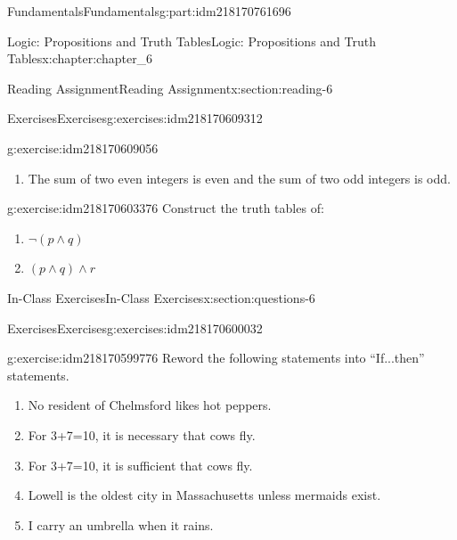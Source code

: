 \documentclass[oneside,10pt,]{book}
\numberwithin{equation}{section}
\begin{document}
\begin{partptx}{Fundamentals}{}{Fundamentals}{}{}{g:part:idm218170761696}
\begin{chapterptx}{Logic: Propositions and Truth Tables}{}{Logic: Propositions and Truth Tables}{}{}{x:chapter:chapter_6}
\begin{sectionptx}{Reading Assignment}{}{Reading Assignment}{}{}{x:section:reading-6}
\begin{exercises-subsection-numberless}{Exercises}{}{Exercises}{}{}{g:exercises:idm218170609312}
\begin{exercisegroup}
\begin{divisionexerciseeg}{1}{}{}{g:exercise:idm218170609056}
\begin{enumerate}[label=(\alph*)]
\item{}The sum of two even integers is even and the sum of two odd integers is odd.%
\end{enumerate}
%
\end{divisionexerciseeg}%
\begin{divisionexerciseeg}{2}{}{}{g:exercise:idm218170603376}%
Construct the truth tables of:%
\begin{multicols}{2}
\begin{enumerate}[label=(\alph*)]
\item{}\(\displaystyle \neg (p\land  q )\)%
\item{}\(\displaystyle (p \land q)\land r\)%
\end{enumerate}
\end{multicols}
%
\end{divisionexerciseeg}%
\end{exercisegroup}
\par\medskip\noindent
\end{exercises-subsection-numberless}
\end{sectionptx}
%
%
\typeout{************************************************}
\typeout{************************************************}
%
\begin{sectionptx}{In-Class Exercises}{}{In-Class Exercises}{}{}{x:section:questions-6}
%
%
%
\typeout{************************************************}
\typeout{************************************************}
%
\begin{exercises-subsection-numberless}{Exercises}{}{Exercises}{}{}{g:exercises:idm218170600032}
\par\medskip\noindent%
%
\begin{exercisegroup}
\begin{divisionexerciseeg}{1}{}{}{g:exercise:idm218170599776}%
Reword the following statements into ``If...then'' statements.%
\begin{enumerate}[label=(\alph*)]
\item{}No resident of Chelmsford likes hot peppers.%
\item{}For 3+7=10, it is necessary that cows fly.%
\item{}For 3+7=10, it is sufficient that cows fly.%
\item{}Lowell is the oldest city in Massachusetts unless mermaids exist.%
\item{}I carry an umbrella when it rains.%
\end{enumerate}

\end{divisionexerciseeg}
\end{exercisegroup}
\end{exercises-subsection-numberless}
\end{sectionptx}
\end{chapterptx}
\end{partptx}
\end{document}
